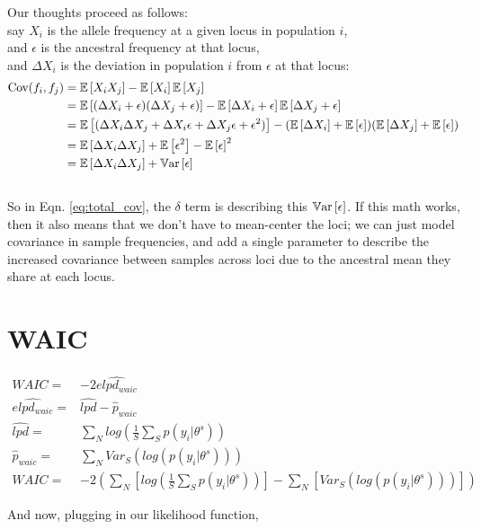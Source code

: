 \documentclass[12pt]{article}
\newcommand{\e}[1]{{\mathbb E}\left[ #1 \right]}
\newcommand{\var}[1]{{\mathbb V \textnormal{ar}}\left[ #1 \right]}
\begin{document}
Our thoughts proceed as follows:\\
say $X_i$ is the allele frequency at a given locus in population $i$,\\
and $\epsilon$ is the ancestral frequency at that locus,\\
and $\Delta X_i$ is the deviation in population $i$ from $\epsilon$ at that locus:\\
\begin{align}
\text{Cov}(f_i,f_j) &= \e{X_iX_j} - \e{X_i}\e{X_j}	\notag\\
			&= \e{(\Delta X_i + \epsilon) (\Delta X_j +
                          \epsilon)} - \e{ \Delta X_i+ \epsilon}\e{\Delta X_j+ \epsilon} \notag\\
			&= \e{(\Delta X_i \Delta X_j + \Delta X_i\epsilon + \Delta X_j\epsilon + \epsilon^2)} -(\e{\Delta X_i}+ \e{\epsilon})(\e{\Delta X_j}+ \e{\epsilon}) \notag\\
			&= \e{\Delta X_i \Delta X_j}  + \e{\epsilon^2} - \e{\epsilon}^2 \notag\\
			&= \e{\Delta X_i \Delta X_j}  + \var{\epsilon}
\end{align}
\\
So in Eqn. \eqref{eq:total_cov}, the $\delta$ term is describing this $\var{\epsilon}$.
If this math works, then it also means that we don't have to mean-center the loci;
we can just model covariance in sample frequencies, 
and add a single parameter to describe the increased covariance between samples across loci 
due to the ancestral mean they share at each locus.

\section{WAIC}
\begin{align}
WAIC =& -2 \widehat{elpd_{waic}}\\
\widehat{elpd_{waic}} =& \widehat{lpd} - \hat{p}_{waic}\\
\widehat{lpd} =& \sum\limits_N log\left(\frac{1}{S}\sum\limits_S p(y_i | \theta^s)	\right)\\
\hat{p}_{waic} =& \sum\limits_N Var_S\left( log \left( p(y_i | \theta^s) \right)	\right)\\
WAIC =& -2 \left( \sum\limits_N \left[ log\left(\frac{1}{S}\sum\limits_S p(y_i | \theta^s)	\right) \right]-
	\sum\limits_N \left[ Var_S\left( log \left( p(y_i | \theta^s) \right)	\right) \right]	\right)
\end{align}


And now, plugging in our likelihood function,
\end{document}
